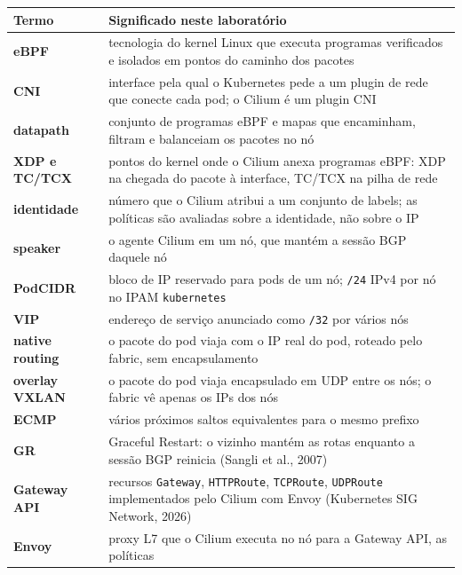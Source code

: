 \documentclass[12pt,openany,oneside,a4paper,chapter=TITLE,english,brazil]{abntex2}
\begin{document}
\begin{quadro}[!htbp]
\caption{Termos principais usados no guia}
\footnotesize
\begin{tabularx}{\textwidth}{|>{\raggedright\arraybackslash\hsize=0.519\hsize}X|>{\raggedright\arraybackslash\hsize=1.481\hsize}X|}
\hline
\textbf{Termo} & \textbf{Significado neste laboratório} \\
\hline
\textbf{eBPF} & tecnologia do kernel Linux que executa programas verificados e isolados
em pontos do caminho dos pacotes \\
\hline
\textbf{CNI} & interface pela qual o Kubernetes pede a um plugin de rede que conecte
cada pod; o Cilium é um plugin CNI \\
\hline
\textbf{datapath} & conjunto de programas eBPF e mapas que encaminham, filtram e balanceiam
os pacotes no nó \\
\hline
\textbf{XDP e TC/TCX} & pontos do kernel onde o Cilium anexa programas eBPF: XDP na chegada do
pacote à interface, TC/TCX na pilha de rede \\
\hline
\textbf{identidade} & número que o Cilium atribui a um conjunto de labels; as políticas são
avaliadas sobre a identidade, não sobre o IP \\
\hline
\textbf{speaker} & o agente Cilium em um nó, que mantém a sessão BGP daquele nó \\
\hline
\textbf{PodCIDR} & bloco de IP reservado para pods de um nó; \texttt{/\allowbreak{}24} IPv4
por nó no IPAM \texttt{kubernetes} \\
\hline
\textbf{VIP} & endereço de serviço anunciado como \texttt{/\allowbreak{}32} por vários
nós \\
\hline
\textbf{native routing} & o pacote do pod viaja com o IP real do pod, roteado pelo fabric, sem
encapsulamento \\
\hline
\textbf{overlay VXLAN} & o pacote do pod viaja encapsulado em UDP entre os nós; o fabric vê
apenas os IPs dos nós \\
\hline
\textbf{ECMP} & vários próximos saltos equivalentes para o mesmo prefixo \\
\hline
\textbf{GR} & Graceful Restart: o vizinho mantém as rotas enquanto a sessão BGP
reinicia (Sangli et al., 2007) \\
\hline
\textbf{Gateway API} & recursos \texttt{Gateway}, \texttt{HTTPRoute}, \texttt{TCPRoute},
\texttt{UDPRoute} implementados pelo Cilium com Envoy (Kubernetes SIG
Network, 2026) \\
\hline
\textbf{Envoy} & proxy L7 que o Cilium executa no nó para a Gateway API, as políticas

\end{tabularx}
\end{quadro}
\end{document}
